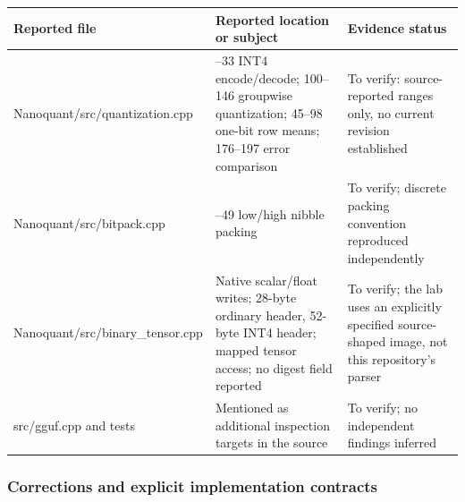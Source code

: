 {\def\LTcaptype{none} %
\begin{longtable}[]{@{}
  >{\raggedright\arraybackslash}p{}
  >{\raggedright\arraybackslash}p{}
  >{\raggedright\arraybackslash}p{}@{}}
\toprule\noalign{}
\begin{minipage}[b]{\linewidth}\raggedright
Reported file
\end{minipage} & \begin{minipage}[b]{\linewidth}\raggedright
Reported location or subject
\end{minipage} & \begin{minipage}[b]{\linewidth}\raggedright
Evidence status
\end{minipage} \\
\midrule\noalign{}
\endhead
\bottomrule\noalign{}
\endlastfoot
Nanoquant/src/quantization.cpp & 22--33 INT4 encode/decode; 100--146 groupwise quantization; 45--98 one-bit row means; 176--197 error comparison & To verify: source-reported ranges only, no current revision established \\
Nanoquant/src/bitpack.cpp & 26--49 low/high nibble packing & To verify; discrete packing convention reproduced independently \\
Nanoquant/src/binary\_tensor.cpp & Native scalar/float writes; 28-byte ordinary header, 52-byte INT4 header; mapped tensor access; no digest field reported & To verify; the lab uses an explicitly specified source-shaped image, not this repository's parser \\
src/gguf.cpp and tests & Mentioned as additional inspection targets in the source & To verify; no independent findings inferred \\
\end{longtable}
}

\subsubsection{Corrections and explicit implementation contracts}\label{appendix-a103e7846d21-corrections-and-explicit-implementation-contracts}

